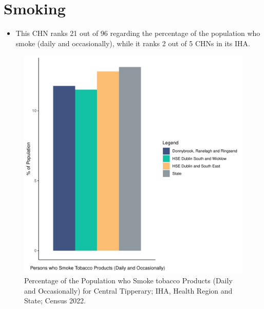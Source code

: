 \documentclass{article}
\begin{document}
\pagebreak

\section{Smoking}\label{sect:Smoking}
\begin{itemize}
\item This CHN ranks  21 out of 96 regarding the percentage of the population who smoke (daily and occasionally), while it ranks   2 out of 5 CHNs in its IHA.
\end{itemize}
\begin{figure}[H]
	\centering
	\includegraphics[width = 120mm]{../figures/SmokingED.pdf}
	\caption{Percentage of the Population who Smoke tobacco Products (Daily and Occasionally) for Central Tipperary; IHA, Health Region and State; Census 2022.}
	\label{fig:2ae19629-1a6a-13a3-e055-000000000001}
	\end{figure}
	
\end{document}
